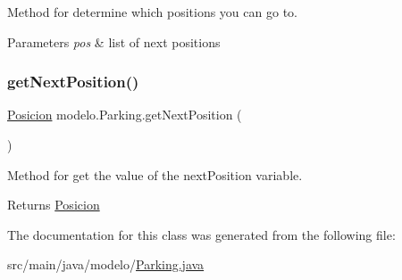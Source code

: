Method for determine which positions you can go to. 


\begin{DoxyParams}{Parameters}
{\em pos} & list of next positions \\
\hline
\end{DoxyParams}
\mbox{\label{classmodelo_1_1_parking_a362f2bda656e3c9157c0589ae458c14a}} 
\subsubsection{\texorpdfstring{get\+Next\+Position()}{getNextPosition()}}
{\footnotesize\ttfamily \mbox{\hyperlink{classmodelo_1_1_posicion}{Posicion}} modelo.\+Parking.\+get\+Next\+Position (\begin{DoxyParamCaption}{ }\end{DoxyParamCaption})}



Method for get the value of the next\+Position variable. 

\begin{DoxyReturn}{Returns}
\mbox{\hyperlink{classmodelo_1_1_posicion}{Posicion}} 
\end{DoxyReturn}


The documentation for this class was generated from the following file\+:\begin{DoxyCompactItemize}
\item 
src/main/java/modelo/\mbox{\hyperlink{_parking_8java}{Parking.\+java}}\end{DoxyCompactItemize}
